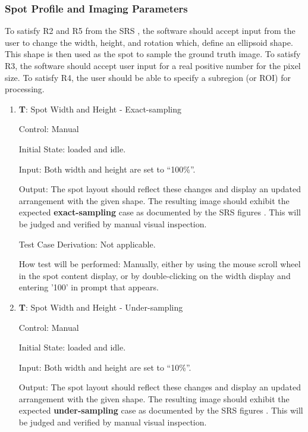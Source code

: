 \documentclass[12pt, titlepage]{article}
\newcounter{testnum} %
\begin{document}
\subsubsection{Spot Profile and Imaging Parameters} \label{subsec_spot}

To satisfy R2 and R5 from the SRS \citep{SRS}, the software should accept input from the user
to change the width, height, and rotation which, define an ellipsoid shape. 
This shape is then used as the spot to sample the ground truth image.
To satisfy R3, the software should accept user input for a real positive number for the pixel size.
To satisfy R4, the user should be able to specify a subregion (or ROI) for processing.

\begin{enumerate}

  \item{\textbf{T\thetestnum \label{T_spotSize}}: Spot Width and Height - Exact-sampling\\}

    Control: Manual
              
    Initial State: \progname{} loaded and idle.
              
    Input: Both width and height are set to ``100\%''.
              
    Output: The spot layout should reflect these changes and display an updated arrangement with the given shape.
      The resulting image should exhibit the expected \textbf{exact-sampling} case as documented by the SRS figures \citep{SRS}.
      This will be judged and verified by manual visual inspection.

    Test Case Derivation: Not applicable.
              
    How test will be performed: Manually, either by using the mouse scroll wheel in
      the spot content display, or by double-clicking on the width display and entering '100'
      in prompt that appears.

    \item{\textbf{T\thetestnum \label{T_spotSize10}}: Spot Width and Height - Under-sampling\\}

    Control: Manual
              
    Initial State: \progname{} loaded and idle.
              
    Input: Both width and height are set to ``10\%''.
              
    Output: The spot layout should reflect these changes and display an updated arrangement with the given shape.
      The resulting image should exhibit the expected \textbf{under-sampling} case as documented by the SRS figures \citep{SRS}.
      This will be judged and verified by manual visual inspection.


\end{enumerate}
\end{document}
